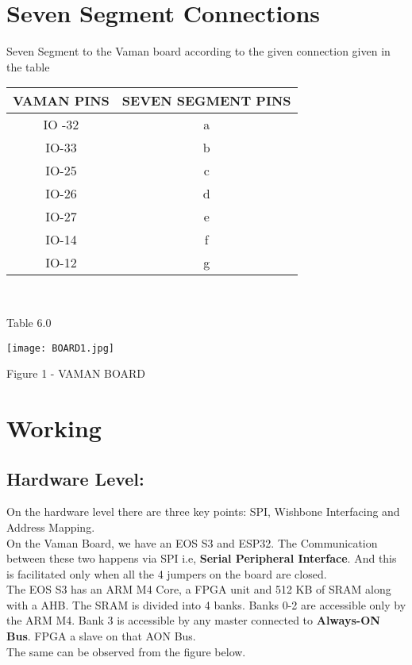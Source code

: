 \documentclass[journal,15pt,twocolumn,tikz, border=5mm]{IEEEtran}
\begin{document}
\section{Seven Segment Connections}
\raggedright
Seven Segment to the Vaman board according to the given connection given in the table\\
\vspace{0.25cm}
\centering
\begin{tabular}{|c|c|}
\hline
VAMAN PINS & SEVEN SEGMENT PINS\\
\hline
IO -32 & a\\
\hline
IO-33 & b\\
\hline
IO-25 & c\\
\hline
IO-26 & d\\
\hline
IO-27 & e\\
\hline
IO-14 & f\\
\hline
IO-12 & g\\
\hline
\end{tabular}\\
\vspace{0.2cm}
\centerline{Table 6.0}
\texttt{[image: BOARD1.jpg]}
\centerline{Figure 1 - VAMAN BOARD}

\section{Working}
\raggedright
\subsection{Hardware Level: }
On the hardware level there are three key points: SPI, Wishbone Interfacing and Address Mapping.\\
\vspace{0.2cm}
On the Vaman Board, we have an EOS S3 and ESP32. The Communication between these two happens via SPI i.e, \textbf{Serial Peripheral Interface}. And this is facilitated only when all the 4 jumpers on the board are closed. \\
\vspace{0.25cm}
The EOS S3 has an ARM M4 Core, a FPGA unit and 512 KB of SRAM along with a AHB. The SRAM is divided into 4 banks. Banks 0-2 are accessible only by the ARM M4. Bank 3 is accessible by any master connected to \textbf{Always-ON Bus}. FPGA a slave on that AON Bus. \\
The same can be observed from the figure below.\\
\end{document}
